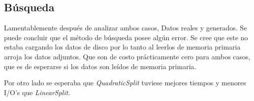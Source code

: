 \documentclass[letterpaper,12pt]{article}
\begin{document}
 
\subsection{Búsqueda}
Lamentablemente después de analizar ambos casos, Datos reales y generados. Se puede concluir que el método de búsqueda posee algún error. Se cree que este no estaba cargando los datos de disco por lo tanto al leerlos de memoria primaria arroja los datos adjuntos. Que son de costo prácticamente cero para ambos casos, que es de esperarse si los datos son leídos de memoria primaria.  

Por otro lado se esperaba que \textit{QuadraticSplit} tuviese mejores tiempos y menores I/O's que \textit{LinearSplit}.
 
\end{document}
